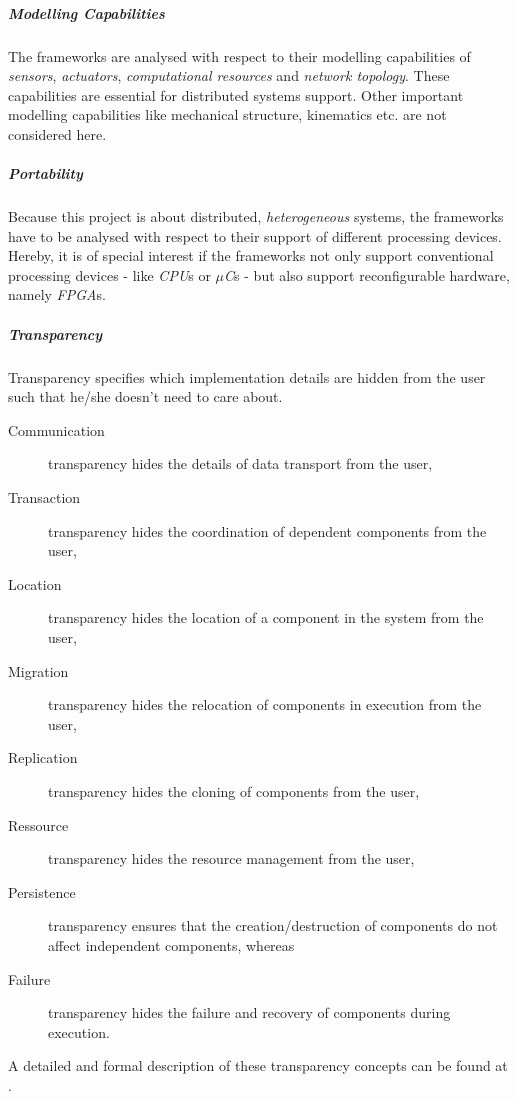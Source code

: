 \documentclass[a4paper,twocolumn]{esapub2005} %
\begin{document}

\subparagraph{Modelling Capabilities}
The frameworks are analysed with respect to their modelling capabilities of \emph{sensors}, \emph{actuators}, \emph{computational resources} and \emph{network topology}.
These capabilities are essential for distributed systems support.
Other important modelling capabilities like mechanical structure, kinematics etc. are not considered here.

\subparagraph{Portability}
Because this project is about distributed, \emph{heterogeneous} systems, the frameworks have to be analysed with respect to their support of different processing devices.
Hereby, it is of special interest if the frameworks not only support conventional processing devices - like \emph{CPU}s or \emph{$\mu$C}s - but also support reconfigurable hardware, namely \emph{FPGA}s.

\subparagraph{Transparency}
Transparency specifies which implementation details are hidden from the user such that he/she doesn't need to care about.
\begin{description}
\item[Communication] transparency hides the details of data transport from the user,
\item[Transaction] transparency hides the coordination of dependent components from the user,
\item[Location] transparency hides the location of a component in the system from the user,
\item[Migration] transparency hides the relocation of components in execution from the user,
\item[Replication] transparency hides the cloning of components from the user,
\item[Ressource] transparency hides the resource management from the user,
\item[Persistence] transparency ensures that the creation/destruction of components do not affect independent components,
whereas \item[Failure] transparency hides the failure and recovery of components during execution.
\end{description}
A detailed and formal description of these transparency concepts can be found at \cite{RM-ODP}.

\end{document}
